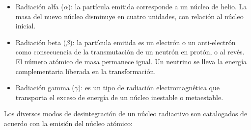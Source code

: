 \begin{itemize}
	\item Radiación alfa ($\alpha $):  la partícula emitida corresponde a un núcleo de helio. La masa del nuevo núcleo disminuye en cuatro unidades, con relación al núcleo inicial. 
	
	\item Radiación beta ($\beta $): la partícula emitida es un electrón o un anti-electrón como consecuencia de la transmutación de un neutrón en protón, o al revés. El número atómico de masa permanece igual. Un neutrino  se lleva la energía complementaria liberada en la transformación. 
	
	\item Radiación gamma ($\gamma $): es un tipo de radiación electromagnética que transporta el exceso de energía de un núcleo inestable o metaestable. 
\end{itemize}

Los diversos modos de desintegración de un núcleo radiactivo son catalogados de acuerdo con la emisión del núcleo atómico:

